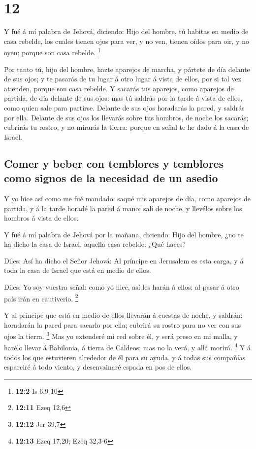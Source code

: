 \hypertarget{section-11}{%
\section{12}\label{section-11}}

 Y fué á mí palabra de Jehová, diciendo:  Hijo
del hombre, tú habitas en medio de casa rebelde, los cuales tienen ojos
para ver, y no ven, tienen oídos para oir, y no oyen; porque son casa
rebelde. \footnote{\textbf{12:2} Is 6,9-10}

 Por tanto tú, hijo del hombre, hazte aparejos de marcha, y
pártete de día delante de sus ojos; y te pasarás de tu lugar á otro
lugar á vista de ellos, por si tal vez atienden, porque son casa
rebelde.  Y sacarás tus aparejos, como aparejos de partida,
de día delante de sus ojos: mas tú saldrás por la tarde á vista de
ellos, como quien sale para partirse.  Delante de sus ojos
horadarás la pared, y saldrás por ella.  Delante de sus ojos
los llevarás sobre tus hombros, de noche los sacarás; cubrirás tu
rostro, y no mirarás la tierra: porque en señal te he dado á la casa de
Israel.

\hypertarget{comer-y-beber-con-temblores-y-temblores-como-signos-de-la-necesidad-de-un-asedio}{%
\subsection{Comer y beber con temblores y temblores como signos de la
necesidad de un
asedio}\label{comer-y-beber-con-temblores-y-temblores-como-signos-de-la-necesidad-de-un-asedio}}

 Y yo hice así como me fué mandado: saqué mis aparejos de
día, como aparejos de partida, y á la tarde horadé la pared á mano; salí
de noche, y llevélos sobre los hombros á vista de ellos.

 Y fué á mí palabra de Jehová por la mañana, diciendo:
 Hijo del hombre, ¿no te ha dicho la casa de Israel, aquella
casa rebelde: ¿Qué haces?

 Diles: Así ha dicho el Señor Jehová: Al príncipe en
Jerusalem es esta carga, y á toda la casa de Israel que está en medio de
ellos.

 Diles: Yo soy vuestra señal: como yo hice, así les harán á
ellos: al pasar á otro país irán en cautiverio. \footnote{\textbf{12:11}
  Ezeq 12,6}

 Y al príncipe que está en medio de ellos llevarán á
cuestas de noche, y saldrán; horadarán la pared para sacarlo por ella;
cubrirá su rostro para no ver con sus ojos la tierra. \footnote{\textbf{12:12}
  Jer 39,7}  Mas yo extenderé mi red sobre él, y será preso
en mi malla, y harélo llevar á Babilonia, á tierra de Caldeos; mas no la
verá, y allá morirá. \footnote{\textbf{12:13} Ezeq 17,20; Ezeq 32,3-6}
 Y á todos los que estuvieren alrededor de él para su
ayuda, y á todas sus compañías esparciré á todo viento, y desenvainaré
espada en pos de ellos.

